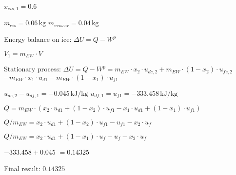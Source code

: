\( x_{eis,1} = 0.6 \)  

\( m_{eis} = 0.06 \, \text{kg} \)  
\( m_{wasser} = 0.04 \, \text{kg} \)  

Energy balance on ice:  
\( \Delta U = Q - W^p \)  

\( V_1 = m_{EW} \cdot V \)  

Stationary process:  
\( \Delta U = Q - W^p = m_{EW} \cdot x_2 \cdot u_{de,2} + m_{EW} \cdot (1 - x_2) \cdot u_{fe,2} \)  
\(- m_{EW} \cdot x_1 \cdot u_{d1} - m_{EW} \cdot (1 - x_1) \cdot u_{f1} \)  

\( u_{de,2} - u_{df,1} = -0.045 \, \text{kJ/kg} \)  
\( u_{df,1} = u_{f1} = -333.458 \, \text{kJ/kg} \)  

\( Q = m_{EW} \cdot (x_2 \cdot u_{d1} + (1 - x_2) \cdot u_{f1} - x_1 \cdot u_{d1} + (1 - x_1) \cdot u_{f1}) \)  

\( Q / m_{EW} = x_2 \cdot u_{d1} + (1 - x_2) \cdot u_{f1} - u_{f1} - x_2 \cdot u_{f} \)  

\( Q / m_{EW} = x_2 \cdot u_{d1} + (1 - x_1) \cdot u_{f} - u_{f} - x_2 \cdot u_{f} \)  

\( -333.458 + 0.045 \)  
\( = 0.14325 \)  

Final result: \( 0.14325 \)